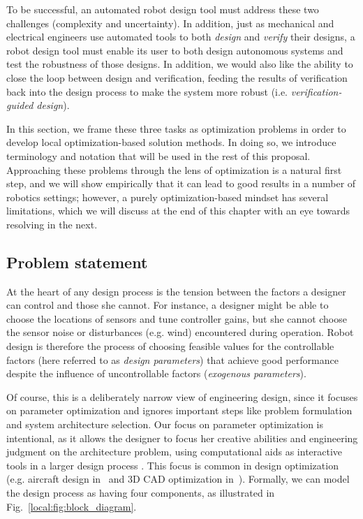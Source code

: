 To be successful, an automated robot design tool must address these two challenges (complexity and uncertainty). In addition, just as mechanical and electrical engineers use automated tools to both \textit{design} and \textit{verify} their designs, a robot design tool must enable its user to both design autonomous systems and test the robustness of those designs. In addition, we would also like the ability to close the loop between design and verification, feeding the results of verification back into the design process to make the system more robust (i.e. \textit{verification-guided design}).

In this section, we frame these three tasks as optimization problems in order to develop local optimization-based solution methods. In doing so, we introduce terminology and notation that will be used in the rest of this proposal. Approaching these problems through the lens of optimization is a natural first step, and we will show empirically that it can lead to good results in a number of robotics settings; however, a purely optimization-based mindset has several limitations, which we will discuss at the end of this chapter with an eye towards resolving in the next.

\subsection{Problem statement}



At the heart of any design process is the tension between the factors a designer can control and those she cannot. For instance, a designer might be able to choose the locations of sensors and tune controller gains, but she cannot choose the sensor noise or disturbances (e.g. wind) encountered during operation.
Robot design is therefore the process of choosing feasible values for the controllable factors (here referred to as \textit{design parameters}) that achieve good performance despite the influence of uncontrollable factors (\textit{exogenous parameters}).

Of course, this is a deliberately narrow view of engineering design, since it focuses on parameter optimization and ignores important steps like problem formulation and system architecture selection. Our focus on parameter optimization is intentional, as it allows the designer to focus her creative abilities and engineering judgment on the architecture problem, using computational aids as interactive tools in a larger design process \cite{sharpe_thesis,cascaval2021differentiable}. This focus is common in design optimization (e.g. aircraft design in~\cite{sharpe_thesis} and 3D CAD optimization in~\cite{cascaval2021differentiable}). Formally, we can model the design process as having four components, as illustrated in Fig.~\ref{local:fig:block_diagram}.

